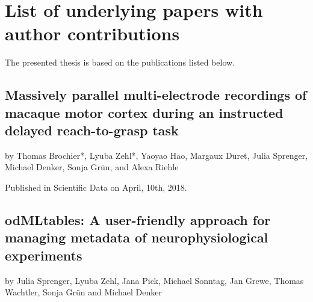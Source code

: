 \clearpage
\thispagestyle{empty}
\section*{List of underlying papers with author contributions}
\label{sec:ListofPapers}

\vspace{2.5cm}

The presented thesis is based on the publications listed below.

\vspace{1cm}

\subsection*{Massively parallel multi-electrode recordings of macaque motor cortex during an instructed delayed reach-to-grasp task}
by Thomas Brochier*, Lyuba Zehl*, Yaoyao Hao, Margaux Duret, Julia Sprenger, Michael Denker, Sonja Grün, and Alexa Riehle

Published in Scientific Data on April, 10th, 2018. \cite{brochier_massively_2018}
% 


\subsection*{odMLtables: A user-friendly approach for managing metadata of neurophysiological experiments}
by Julia Sprenger, Lyuba Zehl, Jana Pick, Michael Sonntag, Jan Grewe, Thomas Wachtler, Sonja Grün and Michael Denker

